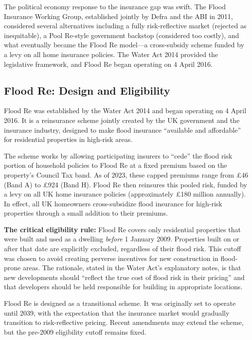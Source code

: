 \documentclass[12pt]{article}
\begin{document}
The political economy response to the insurance gap was swift. The Flood Insurance Working Group, established jointly by Defra and the ABI in 2011, considered several alternatives including a fully risk-reflective market (rejected as inequitable), a Pool Re-style government backstop (considered too costly), and what eventually became the Flood Re model---a cross-subsidy scheme funded by a levy on all home insurance policies. The Water Act 2014 provided the legislative framework, and Flood Re began operating on 4 April 2016.

\subsection{Flood Re: Design and Eligibility}

Flood Re was established by the Water Act 2014 and began operating on 4 April 2016. It is a reinsurance scheme jointly created by the UK government and the insurance industry, designed to make flood insurance ``available and affordable'' for residential properties in high-risk areas.

The scheme works by allowing participating insurers to ``cede'' the flood risk portion of household policies to Flood Re at a fixed premium based on the property's Council Tax band. As of 2023, these capped premiums range from \pounds46 (Band A) to \pounds924 (Band H). Flood Re then reinsures this pooled risk, funded by a levy on all UK home insurance policies (approximately \pounds180 million annually). In effect, all UK homeowners cross-subsidize flood insurance for high-risk properties through a small addition to their premiums.

\textbf{The critical eligibility rule:} Flood Re covers only residential properties that were built and used as a dwelling \textit{before} 1 January 2009. Properties built on or after that date are explicitly excluded, regardless of their flood risk. This cutoff was chosen to avoid creating perverse incentives for new construction in flood-prone areas. The rationale, stated in the Water Act's explanatory notes, is that new developments should ``reflect the true cost of flood risk in their pricing'' and that developers should be held responsible for building in appropriate locations.

Flood Re is designed as a transitional scheme. It was originally set to operate until 2039, with the expectation that the insurance market would gradually transition to risk-reflective pricing. Recent amendments may extend the scheme, but the pre-2009 eligibility cutoff remains fixed.
\end{document}
